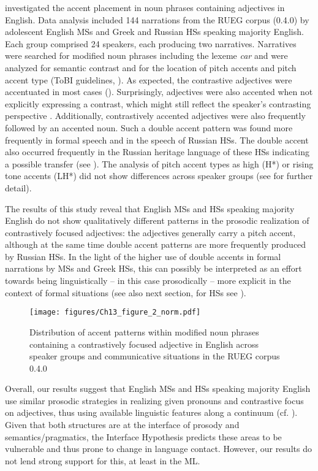 \documentclass[output=paper,colorlinks,citecolor=brown]{langscibook}
\begin{document}
\citet{bottcher2022} investigated the accent placement in noun phrases containing adjectives in English. Data analysis included 144 narrations from the RUEG corpus (0.4.0) by adolescent English MSs and Greek and Russian HSs speaking majority English. Each group comprised 24 speakers, each producing two narratives. Narratives were searched for modified noun phrases including the lexeme \textit{car} and were analyzed for semantic contrast \parencite{gotze2007} and for the location of pitch accents and pitch accent type (ToBI guidelines, \cite{beckaman_hirschberg2006}). As expected, the contrastive adjectives were accentuated in most cases (). Surprisingly, adjectives were also accented when not explicitly expressing a contrast, which might still reflect the speaker’s contrasting perspective \parencite{Kaland2014}. Additionally, contrastively accented adjectives were also frequently followed by an accented noun. Such a double accent pattern was found more frequently in formal speech and in the speech of Russian HSs. The double accent also occurred frequently in the Russian heritage language of these HSs indicating a possible transfer (see \cite{chapters/12, zerbian2022}). The analysis of pitch accent types as high (H*) or rising tone accents (LH*) did not show differences across speaker groups (see \cite{bottcher2022} for further detail).

The results of this study reveal that English MSs and HSs speaking majority English do not show qualitatively different patterns in the prosodic realization of contrastively focused adjectives: the adjectives generally carry a pitch accent, although at the same time double accent patterns are more frequently produced by Russian HSs. In the light of the higher use of double accents in formal narrations by MSs and Greek HSs, this can possibly be interpreted as an effort towards being linguistically -- in this case prosodically -- more explicit in the context of formal situations (see also next section, for HSs see \cite[144]{Polinsky2018book}).


\begin{figure}
    \centering
    \texttt{[image: figures/Ch13\_figure\_2\_norm.pdf]}
    \caption{Distribution of accent patterns within modified noun phrases containing a contrastively focused adjective in English across speaker groups and communicative situations in the RUEG corpus 0.4.0}
    \label{fig:pashkovaetal:2}
\end{figure}


Overall, our results suggest that English MSs and HSs speaking majority English use similar prosodic strategies in realizing given pronouns and contrastive focus on adjectives, thus using available linguistic features along a continuum (cf. \cite{wiese2022}). Given that both structures are at the interface of prosody and semantics/pragmatics, the Interface Hypothesis \parencite{Sorace_2011} predicts these areas to be vulnerable and thus prone to change in language contact. However, our results do not lend strong support for this, at least in the ML.
\end{document}
